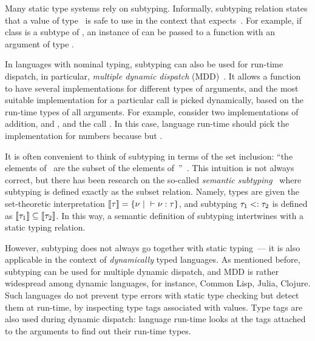 Many static type systems rely on subtyping.
Informally, subtyping relation  states that
a value of type~ is safe to use 
in the context that expects~.
For example, if class  is a subtype of ,
an instance of  can be passed to a function
with an argument of type .

In languages with nominal typing, subtyping can also be used for run-time
dispatch, in particular, \emph{multiple dynamic dispatch} 
(MDD)~\cite{bib:Chambers:1992:Cecil,bib:Clifton:2000:MultiJava}.
It allows a function to have several implementations 
for different types of arguments,
and the most suitable implementation for a particular call 
is picked dynamically, based on the run-time types of all arguments.
For example, consider two implementations of addition,
 and ,
and the call .
In this case, language run-time should pick 
the implementation for numbers 
because  but .

It is often convenient to think of subtyping 
in terms of the set inclusion: ``the elements of~ are the subset
of the elements of~''~\cite{bib:Pierce:2002:TAPL}.
This intuition is not always correct, but there has been research on
the so-called \emph{semantic subtyping}~\cite{bib:Frisch:2008:sem-sub,
	bib:Castagna:2011:sem-sub, bib:Ancona:2016:sem-sub-oo} 
where subtyping is defined exactly as the subset relation. %
Namely, types are given the set-theoretic interpretation
$\llbracket \tau \rrbracket = \{\nu ~\vert~ \vdash \nu : \tau \}$, 
and subtyping $\tau_1 <: \tau_2$ is defined 
as $\llbracket \tau_1 \rrbracket \subseteq \llbracket \tau_2 \rrbracket$.
In this way, a semantic definition of subtyping intertwines with 
a static typing relation.

However, subtyping does not always go together with static typing~---
it is also applicable in the context of \emph{dynamically} typed languages.
As mentioned before, subtyping can be used for multiple dynamic dispatch,
and MDD is rather widespread among dynamic languages, for instance,
Common Lisp, Julia, Clojure.
Such languages do not prevent type errors with static type checking
but detect them at run-time, by inspecting type tags associated with values.
Type tags are also used during dynamic dispatch: 
language run-time looks at the tags attached to the arguments
to find out their run-time types.

